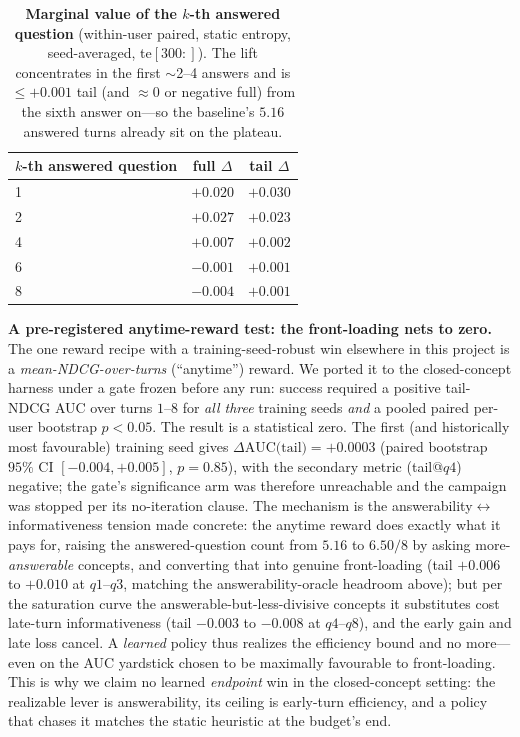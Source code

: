 \documentclass[11pt]{article}
\begin{document}
\begin{table}[h]\centering\small
\begin{tabular}{l c c}
\toprule
$k$-th answered question & full $\Delta$ & tail $\Delta$\\
\midrule
1 & $+0.020$ & $+0.030$\\
2 & $+0.027$ & $+0.023$\\
4 & $+0.007$ & $+0.002$\\
6 & $-0.001$ & $+0.001$\\
8 & $-0.004$ & $+0.001$\\
\bottomrule
\end{tabular}
\caption{\textbf{Marginal value of the $k$-th answered question} (within-user paired, static entropy, seed-averaged,
te$[300{:}]$). The lift concentrates in the first $\sim$2--4 answers and is $\le +0.001$ tail (and $\approx 0$ or
negative full) from the sixth answer on---so the baseline's $5.16$ answered turns already sit on the plateau.}
\label{tab:answered_sat}
\end{table}

\textbf{A pre-registered anytime-reward test: the front-loading nets to zero.} The one reward recipe with a
training-seed-robust win elsewhere in this project is a \emph{mean-NDCG-over-turns} (``anytime'') reward. We ported it to
the closed-concept harness under a gate frozen before any run: success required a positive tail-NDCG AUC over turns
$1$--$8$ for \emph{all three} training seeds \emph{and} a pooled paired per-user bootstrap $p<0.05$. The result is a
statistical zero. The first (and historically most favourable) training seed gives $\Delta\text{AUC(tail)}=+0.0003$
(paired bootstrap $95\%$ CI $[-0.004,+0.005]$, $p=0.85$), with the secondary metric (tail@$q4$) negative; the gate's
significance arm was therefore unreachable and the campaign was stopped per its no-iteration clause. The mechanism is the
answerability$\leftrightarrow$informativeness tension made concrete: the anytime reward does exactly what it pays for,
raising the answered-question count from $5.16$ to $6.50/8$ by asking more-\emph{answerable} concepts, and converting
that into genuine front-loading (tail $+0.006$ to $+0.010$ at $q1$--$q3$, matching the answerability-oracle headroom
above); but per the saturation curve the answerable-but-less-divisive concepts it substitutes cost late-turn
informativeness (tail $-0.003$ to $-0.008$ at $q4$--$q8$), and the early gain and late loss cancel. A \emph{learned}
policy thus realizes the efficiency bound and no more---even on the AUC yardstick chosen to be maximally favourable to
front-loading. This is why we claim no learned \emph{endpoint} win in the closed-concept setting: the realizable lever
is answerability, its ceiling is early-turn efficiency, and a policy that chases it matches the static heuristic at the
budget's end.
\end{document}
